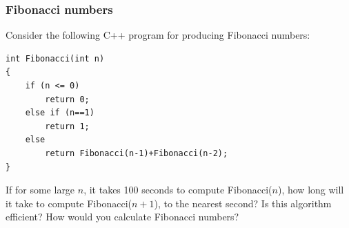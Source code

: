 \subsubsection*{Fibonacci numbers}

Consider the following C++ program for producing Fibonacci numbers:

\begin{verbatim}
int Fibonacci(int n)
{
    if (n <= 0)
        return 0;
    else if (n==1)
        return 1;
    else
        return Fibonacci(n-1)+Fibonacci(n-2);
}
\end{verbatim}

\begin{problem}{If for some large $n$, it takes 100 seconds to compute Fibonacci($n$), how long will it take
to compute Fibonacci($n+1$), to the nearest second? Is this algorithm efficient? How would
you calculate Fibonacci numbers?}
\end{problem}

